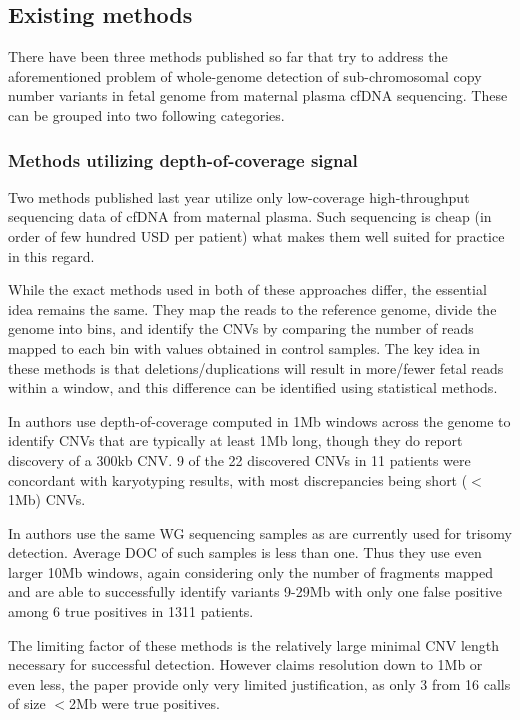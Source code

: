 \subsection{Existing methods}
There have been three methods published so far that try to address the aforementioned problem of whole-genome detection of sub-chromosomal copy number variants in fetal genome from maternal plasma cfDNA sequencing. These can be grouped into two following categories.

\subsubsection{Methods utilizing depth-of-coverage signal}
Two methods published last year \citep{chen2013, srinivasan2013} utilize only low-coverage high-throughput sequencing data of cfDNA from maternal plasma. Such sequencing is cheap (in order of few hundred USD per patient) what makes them well suited for practice in this regard.

While the exact methods used in both of these approaches differ, the essential idea remains the same. They map the reads to the reference genome, divide the genome into bins, and identify the CNVs by comparing the number of reads mapped to each bin with values obtained in control samples. The key idea in these methods is that deletions/duplications will result in more/fewer fetal reads within a window, and this difference can be identified using statistical methods.

In \cite{srinivasan2013} authors use depth-of-coverage computed in 1Mb windows across the genome to identify CNVs that are typically at least 1Mb long, though they do report discovery of a 300kb CNV. 9 of the 22 discovered CNVs in 11 patients were concordant with karyotyping results, with most discrepancies being short ($<$1Mb) CNVs.

In \cite{chen2013} authors use the same WG sequencing samples as are currently used for trisomy detection. Average DOC of such samples is less than one. Thus they use even larger 10Mb windows, again considering only the number of fragments mapped and are able to successfully identify variants 9-29Mb with only one false positive among 6 true positives in 1311 patients.

The limiting factor of these methods is the relatively large minimal CNV length  necessary for successful detection. However \cite{srinivasan2013} claims resolution down to 1Mb or even less, the paper provide only very limited justification, as only 3 from 16 calls of size $<$2Mb were true positives.

